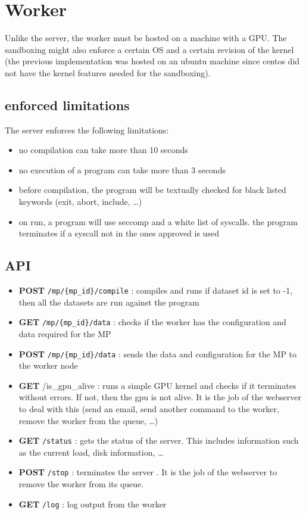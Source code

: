 \section{Worker}

Unlike the server, the worker must be hosted on a machine with a GPU.
The sandboxing might also enforce a certain OS and a certain revision of
the kernel (the previous implementation was hosted on an ubuntu machine
since centos did not have the kernel features needed for the
sandboxing).

\subsection{enforced limitations}

The server enforces the following limitations:

\begin{itemize}
\item
  no compilation can take more than 10 seconds
\item
  no execution of a program can take more than 3 seconds
\item
  before compilation, the program will be textually checked for black
  listed keywords (exit, abort, include, \ldots{})
\item
  on run, a program will use seccomp and a white list of syscalls. the
  program terminates if a syscall not in the ones approved is used
\end{itemize}

\subsection{API}

\begin{itemize}
\item
  \textbf{POST} \texttt{/mp/\{mp\_id\}/compile} : compiles and runs
  \textbar{} if dataset id is set to -1, then all the datasets are run
  against the program \textbar{}
\item
  \textbf{GET} \texttt{/mp/\{mp\_id\}/data} : checks if the worker has
  the configuration and data required for the MP
\item
  \textbf{POST} \texttt{/mp/\{mp\_id\}/data} : sends the data and
  configuration for the MP to the worker node
\item
  \textbf{GET} /is\_gpu\_alive : runs a simple GPU kernel and checks if
  it terminates without errors. If not, then the gpu is not alive. It is
  the job of the webserver to deal with this (send an email, send
  another command to the worker, remove the worker from the queue,
  \ldots{})
\item
  \textbf{GET} \texttt{/status} : gets the status of the server. This
  includes information such as the current load, disk information,
  \ldots{}
\item
  \textbf{POST} \texttt{/stop} : terminates the server . It is the job
  of the webserver to remove the worker from its queue.
\item
  \textbf{GET} \texttt{/log} : log output from the worker
\end{itemize}

